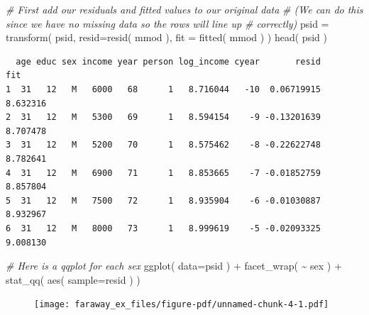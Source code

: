 \documentclass[
  letterpaper,
  DIV=11,
  numbers=noendperiod]{scrreprt}
\newenvironment{Shaded}{\begin{snugshade}}{\end{snugshade}}
\newcommand{\AttributeTok}[1]{\textcolor[rgb]{0.49,0.56,0.16}{#1}}
\newcommand{\CommentTok}[1]{\textcolor[rgb]{0.38,0.63,0.69}{\textit{#1}}}
\newcommand{\FunctionTok}[1]{\textcolor[rgb]{0.02,0.16,0.49}{#1}}
\newcommand{\NormalTok}[1]{\textcolor[rgb]{0.00,0.44,0.13}{#1}}
\newcommand{\OtherTok}[1]{\textcolor[rgb]{0.00,0.44,0.13}{#1}}
\newcommand{\SpecialCharTok}[1]{\textcolor[rgb]{0.25,0.44,0.63}{#1}}
\begin{document}
\begin{Shaded}
\begin{Highlighting}[]
\CommentTok{\# First add our residuals and fitted values to our original data}
\CommentTok{\# (We can do this since we have no missing data so the rows will line up}
\CommentTok{\# correctly)}
\NormalTok{psid }\OtherTok{=} \FunctionTok{transform}\NormalTok{( psid,  }\AttributeTok{resid=}\FunctionTok{resid}\NormalTok{( mmod ),}
                  \AttributeTok{fit =} \FunctionTok{fitted}\NormalTok{( mmod ) )}
\FunctionTok{head}\NormalTok{( psid )}
\end{Highlighting}
\end{Shaded}

\begin{verbatim}
  age educ sex income year person log_income cyear       resid      fit
1  31   12   M   6000   68      1   8.716044   -10  0.06719915 8.632316
2  31   12   M   5300   69      1   8.594154    -9 -0.13201639 8.707478
3  31   12   M   5200   70      1   8.575462    -8 -0.22622748 8.782641
4  31   12   M   6900   71      1   8.853665    -7 -0.01852759 8.857804
5  31   12   M   7500   72      1   8.935904    -6 -0.01030887 8.932967
6  31   12   M   8000   73      1   8.999619    -5 -0.02093325 9.008130
\end{verbatim}

\begin{Shaded}
\begin{Highlighting}[]
\CommentTok{\# Here is a qqplot for each sex}
\FunctionTok{ggplot}\NormalTok{( }\AttributeTok{data=}\NormalTok{psid ) }\SpecialCharTok{+}
    \FunctionTok{facet\_wrap}\NormalTok{( }\SpecialCharTok{\textasciitilde{}}\NormalTok{ sex ) }\SpecialCharTok{+}
    \FunctionTok{stat\_qq}\NormalTok{( }\FunctionTok{aes}\NormalTok{( }\AttributeTok{sample=}\NormalTok{resid ) )}
\end{Highlighting}
\end{Shaded}

\begin{figure}[H]

{\centering \texttt{[image: faraway\_ex\_files/figure-pdf/unnamed-chunk-4-1.pdf]}

}

\end{figure}
\end{document}
